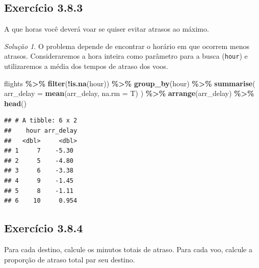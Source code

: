 \documentclass[
]{latex/krantz}
\newenvironment{Shaded}{\begin{snugshade}}{\end{snugshade}}
\newcommand{\AttributeTok}[1]{\textcolor[rgb]{0.13,0.29,0.53}{#1}}
\newcommand{\FunctionTok}[1]{\textcolor[rgb]{0.13,0.29,0.53}{\textbf{#1}}}
\newcommand{\NormalTok}[1]{#1}
\newcommand{\SpecialCharTok}[1]{\textcolor[rgb]{0.81,0.36,0.00}{\textbf{#1}}}
\theoremstyle{definition}
\theoremstyle{definition}
\theoremstyle{definition}
\theoremstyle{definition}
\theoremstyle{remark}
\newtheorem*{solution}{Solução}
\begin{document}
\hypertarget{exr3-8-3}{%
\subsection*{Exercício 3.8.3}\label{exr3-8-3}}

A que horas você deverá voar se quiser evitar atrasos ao máximo.

\begin{solution}

O problema depende de encontrar o horário em que ocorrem menos atrasos. Consideraremos a hora inteira como parâmetro para a busca (\texttt{hour}) e utilizaremos a média dos tempos de atraso dos voos.

\begin{Shaded}
\begin{Highlighting}[]
\NormalTok{flights }\SpecialCharTok{\%\textgreater{}\%}
    \FunctionTok{filter}\NormalTok{(}\SpecialCharTok{!}\FunctionTok{is.na}\NormalTok{(hour)) }\SpecialCharTok{\%\textgreater{}\%}
    \FunctionTok{group\_by}\NormalTok{(hour) }\SpecialCharTok{\%\textgreater{}\%}
    \FunctionTok{summarise}\NormalTok{(}
        \AttributeTok{arr\_delay =} \FunctionTok{mean}\NormalTok{(arr\_delay, }\AttributeTok{na.rm =}\NormalTok{ T)}
\NormalTok{    ) }\SpecialCharTok{\%\textgreater{}\%}
    \FunctionTok{arrange}\NormalTok{(arr\_delay) }\SpecialCharTok{\%\textgreater{}\%}
    \FunctionTok{head}\NormalTok{()}
\end{Highlighting}
\end{Shaded}

\begin{verbatim}
## # A tibble: 6 x 2
##    hour arr_delay
##   <dbl>     <dbl>
## 1     7    -5.30 
## 2     5    -4.80 
## 3     6    -3.38 
## 4     9    -1.45 
## 5     8    -1.11 
## 6    10     0.954
\end{verbatim}

\end{solution}

\hypertarget{exr3-8-4}{%
\subsection*{Exercício 3.8.4}\label{exr3-8-4}}

Para cada destino, calcule os minutos totais de atraso. Para cada voo, calcule a proporção de atraso total par seu destino.
\end{document}
